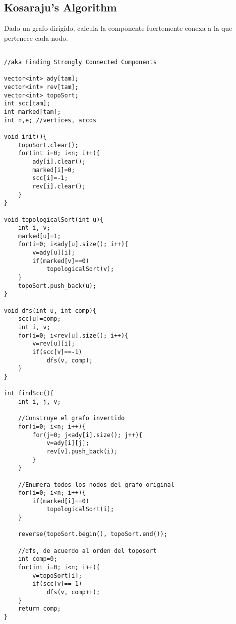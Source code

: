 \documentclass[11pt,letterpaper,twocolumn,twosided]{article}
\begin{document}
\subsection{Kosaraju's Algorithm}
Dado un grafo dirigido, calcula la componente fuertemente conexa a la que pertenece cada nodo.
\begin{lstlisting}

//aka Finding Strongly Connected Components

vector<int> ady[tam];
vector<int> rev[tam];
vector<int> topoSort;
int scc[tam];
int marked[tam];
int n,e; //vertices, arcos

void init(){
	topoSort.clear();
	for(int i=0; i<n; i++){
		ady[i].clear();
		marked[i]=0;
		scc[i]=-1;
		rev[i].clear();
	}
}

void topologicalSort(int u){
	int i, v;
	marked[u]=1;
	for(i=0; i<ady[u].size(); i++){
		v=ady[u][i];
		if(marked[v]==0)
			topologicalSort(v);
	}
	topoSort.push_back(u);
}

void dfs(int u, int comp){
	scc[u]=comp;
	int i, v;
	for(i=0; i<rev[u].size(); i++){
		v=rev[u][i];
		if(scc[v]==-1)
			dfs(v, comp);
	}
}

int findScc(){
	int i, j, v;
	
	//Construye el grafo invertido
	for(i=0; i<n; i++){
		for(j=0; j<ady[i].size(); j++){
			v=ady[i][j];
			rev[v].push_back(i);
		}
	}
	
	//Enumera todos los nodos del grafo original
	for(i=0; i<n; i++){
		if(marked[i]==0)
			topologicalSort(i);
	}

	reverse(topoSort.begin(), topoSort.end());
	
	//dfs, de acuerdo al orden del toposort
	int comp=0;
	for(int i=0; i<n; i++){
		v=topoSort[i];
		if(scc[v]==-1)
			dfs(v, comp++);
	}
	return comp;
}

\end{lstlisting}
\end{document}
